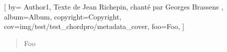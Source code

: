 
[
  by={
         Author1,
         Texte de Jean Richepin, chanté par Georges Brassens  },
  album={Album},
  copyright={Copyright},
    cov={img/test/test_chordpro/metadata_cover},
  foo={Foo},
]

\cover




\begin{verse}
    Foo
\end{verse}

\endsong
